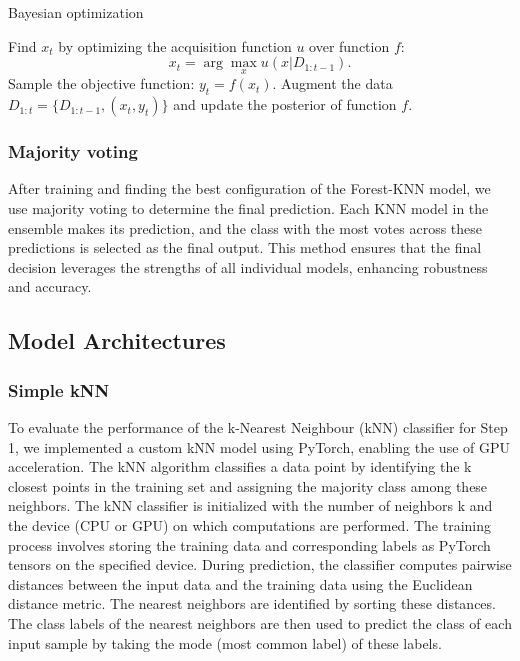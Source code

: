 \documentclass[a4paper]{article}
\begin{document}
\begin{algorithm}
\caption{Bayesian optimization}
\label{alg:bayesian_optimization}
\begin{algorithmic}[1]
    \State Find $x_t$ by optimizing the acquisition function $u$ over function $f$:
    \[
    x_t = \arg\max_x u(x|D_{1:t-1}).
    \]
    \State Sample the objective function: $y_t = f(x_t)$.
    \State Augment the data $D_{1:t} = \{D_{1:t-1}, (x_t, y_t)\}$ and update the posterior of function $f$.
\EndFor
\end{algorithmic}
\end{algorithm}

\subsubsection{Majority voting}
After training and finding the best configuration of the Forest-KNN model, we use majority voting to determine the final prediction. Each KNN model in the ensemble makes its prediction, and the class with the most votes across these predictions is selected as the final output. This method ensures that the final decision leverages the strengths of all individual models, enhancing robustness and accuracy.



\subsection{Model Architectures}
\subsubsection{Simple kNN}\label{simpleknn}
To evaluate the performance of the k-Nearest Neighbour (kNN) classifier for Step 1, we implemented a custom kNN model using PyTorch, enabling the use of GPU acceleration. The kNN algorithm classifies a data point by identifying the k closest points in the training set and assigning the majority class among these neighbors. The kNN classifier is initialized with the number of neighbors k and the device (CPU or GPU) on which computations are performed. The training process involves storing the training data and corresponding labels as PyTorch tensors on the specified device. During prediction, the classifier computes pairwise distances between the input data and the training data using the Euclidean distance metric. The nearest neighbors are identified by sorting these distances. The class labels of the nearest neighbors are then used to predict the class of each input sample by taking the mode (most common label) of these labels.
\end{document}

